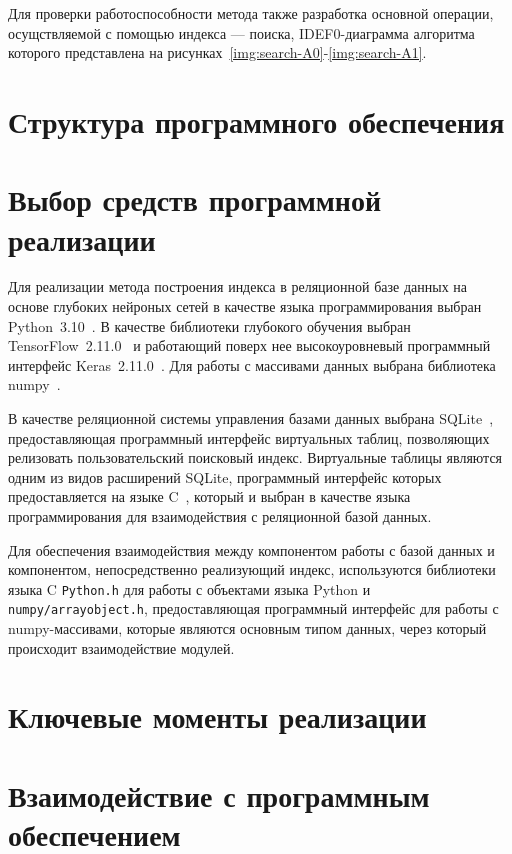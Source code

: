 
Для проверки работоспособности метода также разработка основной операции,
осущствляемой с помощью индекса --- поиска, IDEF0-диаграмма алгоритма которого
представлена на рисунках~\ref{img:search-A0}-\ref{img:search-A1}.


\section{Структура программного обеспечения}

\section{Выбор средств программной реализации}

Для реализации метода построения индекса в реляционной базе данных на основе
глубоких нейроных сетей в качестве языка программирования выбран
Python~3.10~\cite{python}.  В качестве библиотеки глубокого обучения выбран
TensorFlow~2.11.0~\cite{tf} и работающий поверх нее высокоуровневый программный
интерфейс Keras~2.11.0~\cite{keras}.  Для работы с массивами данных выбрана
библиотека numpy~\cite{numpy}.

В качестве реляционной системы управления базами данных выбрана
SQLite~\cite{sqlite}, предоставляющая программный интерфейс виртуальных таблиц,
позволяющих релизовать пользовательский поисковый индекс. Виртуальные таблицы
являются одним из видов расширений SQLite, программный интерфейс которых
предоставляется на языке C~\cite{c}, который и выбран в качестве языка
программирования для взаимодействия с реляционной базой данных.

Для обеспечения взаимодействия между компонентом работы с базой данных и
компонентом, непосредственно реализующий индекс, используются библиотеки языка C
\texttt{Python.h} для работы с объектами языка Python и
\texttt{numpy/arrayobject.h}, предоставляющая программный интерфейс для работы с
numpy-массивами, которые являются основным типом данных, через который
происходит взаимодействие модулей.

\section{Ключевые моменты реализации}

\section{Взаимодействие с программным обеспечением}
